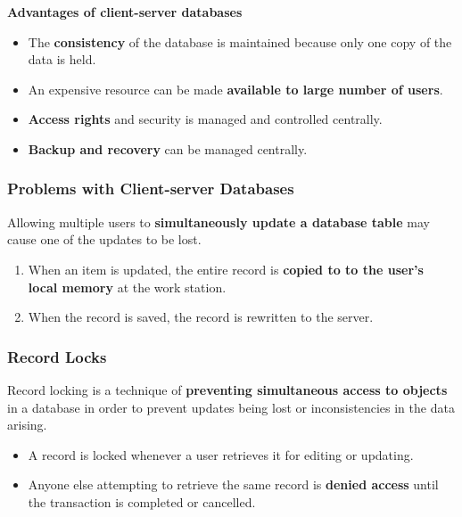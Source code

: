 \textbf{Advantages of client-server databases}
\begin{itemize}
    \item The \textbf{consistency} of the database is maintained because only one copy of the data is held.
    \item An expensive resource can be made \textbf{available to large number of users}.
    \item \textbf{Access rights} and security is managed and controlled centrally.
    \item \textbf{Backup and recovery} can be managed centrally.
\end{itemize}

\subsubsection*{Problems with Client-server Databases}

Allowing multiple users to \textbf{simultaneously update a database table} may cause one of the updates to be lost.
\begin{enumerate}
    \item When an item is updated, the entire record is \textbf{copied to to the user's local memory} at the work station.
    \item When the record is saved, the record is rewritten to the server.
\end{enumerate}

\subsubsection*{Record Locks}

Record locking is a technique of \textbf{preventing simultaneous access to objects} in a database in order to prevent updates being lost or inconsistencies in the data arising.
\begin{itemize}
    \item A record is locked whenever a user retrieves it for editing or updating.
    \item Anyone else attempting to retrieve the same record is \textbf{denied access} until the transaction is completed or cancelled.
\end{itemize}

